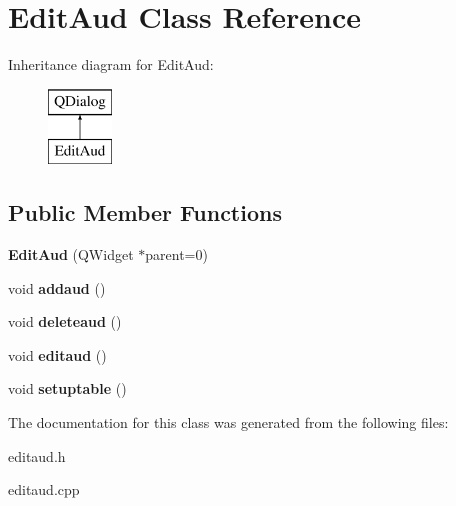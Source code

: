 \hypertarget{class_edit_aud}{}\section{Edit\+Aud Class Reference}
\label{class_edit_aud}
Inheritance diagram for Edit\+Aud\+:\begin{figure}[H]
\begin{center}
\leavevmode
\includegraphics[height=2.000000cm]{class_edit_aud}
\end{center}
\end{figure}
\subsection*{Public Member Functions}
\begin{DoxyCompactItemize}
\item 
\hypertarget{class_edit_aud_a8aa69d8880550b5bde8d6f6c39ad5f39}{}\label{class_edit_aud_a8aa69d8880550b5bde8d6f6c39ad5f39} 
{\bfseries Edit\+Aud} (Q\+Widget $\ast$parent=0)
\item 
\hypertarget{class_edit_aud_adfe615e92f2227885bb93def076093bf}{}\label{class_edit_aud_adfe615e92f2227885bb93def076093bf} 
void {\bfseries addaud} ()
\item 
\hypertarget{class_edit_aud_a9562ccf126f504c7bfa12e4680673c20}{}\label{class_edit_aud_a9562ccf126f504c7bfa12e4680673c20} 
void {\bfseries deleteaud} ()
\item 
\hypertarget{class_edit_aud_a5e9c6752850192ac7c9e8574cc2d83b5}{}\label{class_edit_aud_a5e9c6752850192ac7c9e8574cc2d83b5} 
void {\bfseries editaud} ()
\item 
\hypertarget{class_edit_aud_a26608050cfa4ea590d06bca5b06dd040}{}\label{class_edit_aud_a26608050cfa4ea590d06bca5b06dd040} 
void {\bfseries setuptable} ()
\end{DoxyCompactItemize}


The documentation for this class was generated from the following files\+:\begin{DoxyCompactItemize}
\item 
editaud.\+h\item 
editaud.\+cpp\end{DoxyCompactItemize}
